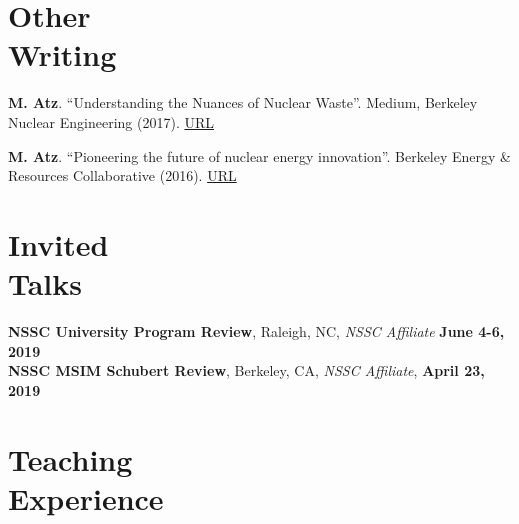 \documentclass[margin,line]{resume}
\begin{document}
\begin{resume}
\begin{bibenum}
\end{bibenum}
\section{\mysidestyle Other\\Writing}
\begin{bibenum}

    \item \textbf{M. Atz}. ``Understanding the Nuances of Nuclear Waste''. Medium, Berkeley Nuclear Engineering (2017). \href{https://medium.com/berkeley-nuclear-engineering/understanding-the-nuances-of-nuclear-waste-5c123ba4211f}{URL}
    
    \item \textbf{M. Atz}. ``Pioneering the future of nuclear energy innovation''. Berkeley Energy \& Resources Collaborative (2016). \href{http://berc.berkeley.edu/pioneering-future-nuclear-energy-innovation/}{URL}
\end{bibenum}

\vspace{8mm}
\section{\mysidestyle Invited\\Talks}
\textbf{NSSC University Program Review}, Raleigh, NC, \textsl{NSSC Affiliate} \hfill \textbf{June 4-6, 2019}\\
\textbf{NSSC MSIM Schubert Review}, Berkeley, CA, \textsl{NSSC Affiliate}, \hfill \textbf{April 23, 2019}\\

\section{\mysidestyle Teaching\\Experience}


\end{resume}
\end{document}
